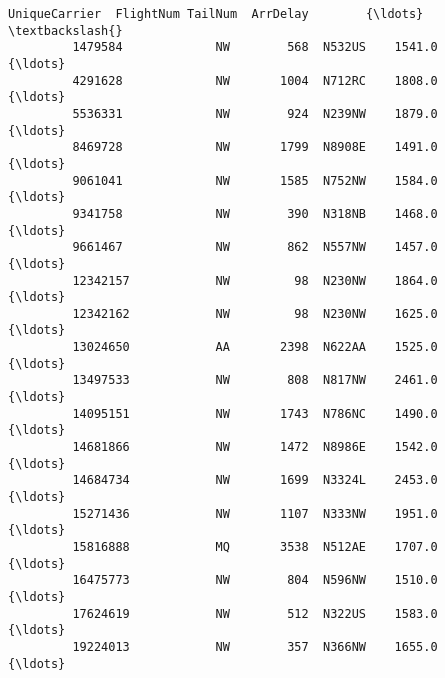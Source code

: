 \documentclass[11pt]{article}
\begin{document}
\begin{Verbatim}[commandchars=\\\{\}]
                  UniqueCarrier  FlightNum TailNum  ArrDelay        {\ldots}          \textbackslash{}
         1479584             NW        568  N532US    1541.0        {\ldots}           
         4291628             NW       1004  N712RC    1808.0        {\ldots}           
         5536331             NW        924  N239NW    1879.0        {\ldots}           
         8469728             NW       1799  N8908E    1491.0        {\ldots}           
         9061041             NW       1585  N752NW    1584.0        {\ldots}           
         9341758             NW        390  N318NB    1468.0        {\ldots}           
         9661467             NW        862  N557NW    1457.0        {\ldots}           
         12342157            NW         98  N230NW    1864.0        {\ldots}           
         12342162            NW         98  N230NW    1625.0        {\ldots}           
         13024650            AA       2398  N622AA    1525.0        {\ldots}           
         13497533            NW        808  N817NW    2461.0        {\ldots}           
         14095151            NW       1743  N786NC    1490.0        {\ldots}           
         14681866            NW       1472  N8986E    1542.0        {\ldots}           
         14684734            NW       1699  N3324L    2453.0        {\ldots}           
         15271436            NW       1107  N333NW    1951.0        {\ldots}           
         15816888            MQ       3538  N512AE    1707.0        {\ldots}           
         16475773            NW        804  N596NW    1510.0        {\ldots}           
         17624619            NW        512  N322US    1583.0        {\ldots}           
         19224013            NW        357  N366NW    1655.0        {\ldots}           
         

\end{Verbatim}
\end{document}
